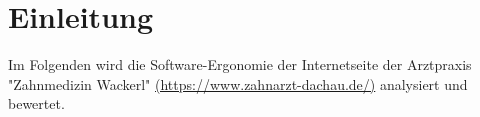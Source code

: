 \section{Einleitung} \label{sec:einleitung}

Im Folgenden wird die Software-Ergonomie der Internetseite der Arztpraxis "Zahnmedizin Wackerl" \href{https://www.zahnarzt-dachau.de/}{(https://www.zahnarzt-dachau.de/)} analysiert und bewertet.